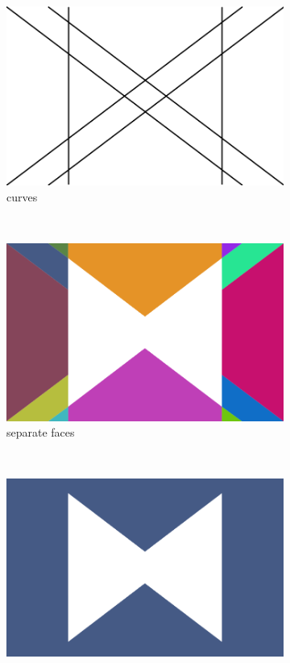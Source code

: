 \begin{figure}%
  \centering
  \begin{subfigure}{.32\textwidth}
    \includegraphics[width=\textwidth]{figures/intro_curves1.png}
    \caption{curves} \label{subfig:intro_unboundedFaces_a}
  \end{subfigure}%
  ~%
  \begin{subfigure}{.32\textwidth}
    \includegraphics[width=\textwidth]{figures/intro_unboundedFaces_b.png}
    \caption{separate faces} \label{subfig:intro_unboundedFaces_b}
  \end{subfigure}%
  ~%
  \begin{subfigure}{.32\textwidth}
    \includegraphics[width=\textwidth]{figures/intro_unboundedFaces_c.png}

\end{subfigure}
\end{figure}
